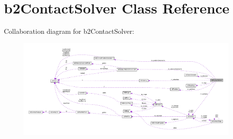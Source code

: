 \hypertarget{classb2ContactSolver}{}\section{b2\+Contact\+Solver Class Reference}
\label{classb2ContactSolver}


Collaboration diagram for b2\+Contact\+Solver\+:
\nopagebreak
\begin{figure}[H]
\begin{center}
\leavevmode
\includegraphics[width=350pt]{classb2ContactSolver__coll__graph}
\end{center}
\end{figure}

